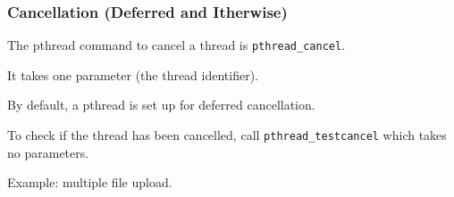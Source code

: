 \begin{frame}
\frametitle{Cancellation (Deferred and Itherwise)}

The pthread command to cancel a thread is \texttt{pthread\_cancel}.

It takes one parameter (the thread identifier). 

By default, a pthread is set up for deferred cancellation. 

To check if the thread has been cancelled, call  \texttt{pthread\_testcancel} which takes no parameters.

Example: multiple file upload.

\end{frame}



